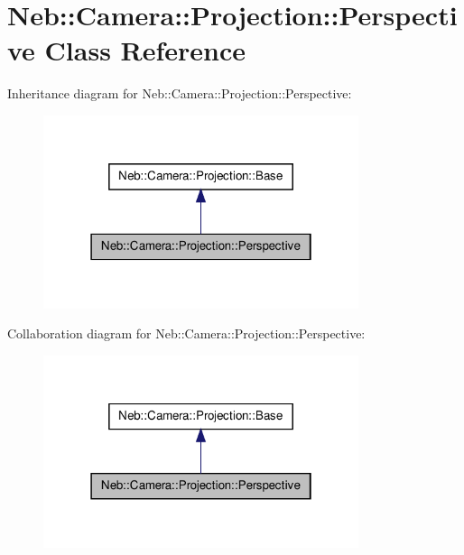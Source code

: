\hypertarget{classNeb_1_1Camera_1_1Projection_1_1Perspective}{\section{\-Neb\-:\-:\-Camera\-:\-:\-Projection\-:\-:\-Perspective \-Class \-Reference}
\label{classNeb_1_1Camera_1_1Projection_1_1Perspective}
}


\-Inheritance diagram for \-Neb\-:\-:\-Camera\-:\-:\-Projection\-:\-:\-Perspective\-:\nopagebreak
\begin{figure}[H]
\begin{center}
\leavevmode
\includegraphics[width=262pt]{classNeb_1_1Camera_1_1Projection_1_1Perspective__inherit__graph}
\end{center}
\end{figure}


\-Collaboration diagram for \-Neb\-:\-:\-Camera\-:\-:\-Projection\-:\-:\-Perspective\-:\nopagebreak
\begin{figure}[H]
\begin{center}
\leavevmode
\includegraphics[width=262pt]{classNeb_1_1Camera_1_1Projection_1_1Perspective__coll__graph}
\end{center}
\end{figure}

